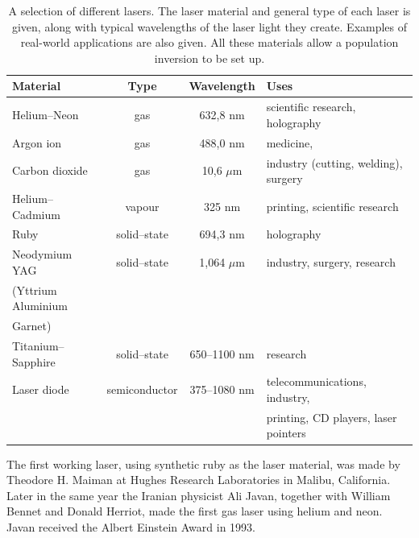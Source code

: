 \begin{table}[H]
\begin{center}
\begin{tabular}{lccl}
\hline
\textbf{Material} & \textbf{Type} & \textbf{Wavelength} & \textbf{Uses} \\
\hline
Helium--Neon & gas & 632,8 nm & scientific research, holography \\
Argon ion & gas & 488,0 nm & medicine, \\
Carbon dioxide & gas & 10,6 $\mu$m & industry (cutting, welding), surgery \\
Helium--Cadmium & vapour & 325 nm & printing, scientific research \\
Ruby & solid--state & 694,3 nm & holography \\
Neodymium YAG & solid--state & 1,064 $\mu$m & industry, surgery, research \\
(Yttrium Aluminium \\
Garnet) \\
Titanium--Sapphire & solid--state & 650--1100 nm & research \\
Laser diode & semiconductor & 375--1080 nm & telecommunications, industry, \\
& & & printing, CD players, laser pointers \\
\hline
\end{tabular}
\end{center}
\caption{A selection of different lasers. The laser material and general type of each laser is given, along with typical wavelengths of the laser light they create. Examples of real-world applications are also given. All these materials allow a population inversion to be set up.}
\label{lasertypes}
\end{table}


\begin{IFact}
{The first working laser, using synthetic ruby as the laser material, was made by Theodore H. Maiman at Hughes Research Laboratories in Malibu, California. Later in the same year the Iranian physicist Ali Javan, together with William Bennet and Donald Herriot, made the first gas laser using helium and neon. Javan received the Albert Einstein Award in 1993.}
\end{IFact}


